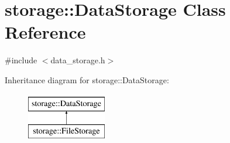 \hypertarget{classstorage_1_1DataStorage}{
\section{storage::DataStorage Class Reference}
\label{da/db4/classstorage_1_1DataStorage}
}


{\ttfamily \#include $<$data\_\-storage.h$>$}

Inheritance diagram for storage::DataStorage:\begin{figure}[H]
\begin{center}
\leavevmode
\includegraphics[height=2.000000cm]{da/db4/classstorage_1_1DataStorage}
\end{center}
\end{figure}
